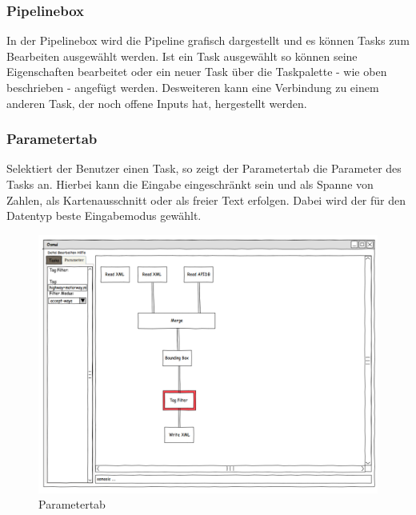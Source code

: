 \documentclass[a4paper,12pt]{scrartcl}
\begin{document}
\subsubsection{Pipelinebox}
In der Pipelinebox wird die Pipeline grafisch dargestellt und es können Tasks zum Bearbeiten ausgewählt werden. Ist ein Task ausgewählt so können seine Eigenschaften
bearbeitet oder ein neuer Task über die Taskpalette - wie oben beschrieben - angefügt werden. Desweiteren kann eine Verbindung zu einem anderen Task, der noch offene
Inputs hat, hergestellt werden.
\subsubsection{Parametertab}
Selektiert der Benutzer einen Task, so zeigt der Parametertab die Parameter des Tasks an.
Hierbei kann die Eingabe eingeschränkt sein und als Spanne von Zahlen, als Kartenausschnitt oder als freier Text erfolgen. Dabei wird der für den Datentyp beste Eingabemodus gewählt.\\
\begin{center}
\begin{figure}[h!]
\begin{center}
\includegraphics[width=15cm]{ui_prototype/OsmUi_Parameter_Optionen.png}
\caption{Parametertab}
\end{center}
\end{figure}
\end{center}
\end{document}

